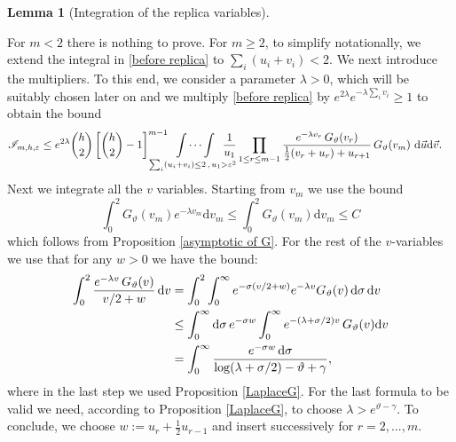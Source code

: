 \documentclass[a4paper,reqno,11pt]{amsart}
\makeatletter
\renewenvironment{proof}[1][\proofname]{\par
\pushQED{\qed}%
\normalfont \topsep4\p@\@plus4\p@\relax
\trivlist
\item[\hskip\labelsep
\bfseries
#1\@addpunct{.}]\ignorespaces
}{%
\popQED\endtrivlist\@endpefalse
}
\numberwithin{equation}{section}
\theoremstyle{mytheorem}
\newtheorem{lemma}[theorem]{Lemma}
\newcommand{\ga}{\alpha}
\newcommand{\gt}{\vartheta}
\newcommand{\gl}{\lambda}
\newcommand{\gs}{\sigma}
\renewcommand{\epsilon}{\varepsilon}
\renewcommand{\theta}{\vartheta}
\newcommand\mI{\mathscr{I}}
\newenvironment{comment}
    {\begin{center}
    \begin{tabular}{|p{0.9\textwidth}|}
    \hline\\
    \color{red}
    }
    {
    \\\\\hline
    \end{tabular}
    \end{center}
    }
\newcommand\dd{\mathrm{d}}
\makeatother
\begin{document}
{\begin{lemma}[Integration of the replica variables]
\end{lemma}
\begin{proof}
For $m<2$ there is nothing to prove. For $m\ge 2$, to simplify notationally, we extend the integral in \eqref{before replica} to $\sum_{i}(u_i+v_i)<2$.
We next introduce the multipliers. 
To this end, we consider a parameter $\gl>0$, which will be suitably chosen later on
 and we multiply \eqref{before replica} by $e^{2\gl} e^{-\gl\sum_i v_i} \geq 1$
to obtain the bound
\begin{equation}
\begin{split}
    \mI_{m,h,\epsilon}
    & \le e^{2\lambda} 
    {h \choose 2} \left[ {h\choose 2} -1 \right]^{m-1} \hskip -.5cm
    \idotsint\limits_{\sum_i(u_i+v_i)\le 2\,,\, u_1>\epsilon^2}  
    \hskip -.5cm  \frac{1}{u_1}
    \prod _{1\le r\le m-1} \frac{e^{-\gl v_r} \, G_\gt(v_r)}{\frac{1}{2}(v_r+u_r)+u_{r+1}}  \,
     G_\gt(v_m) \,\, \dd\vec u \dd\vec v .
\end{split}
\end{equation}
Next we integrate all the $v$ variables. Starting from $v_m$ we  use the bound
\begin{equation}\label{a}
        \int_0^2 G_\gt(v_m)e^{-\gl v_m} \dd v_m
        \le    \int_0^2 G_\gt(v_m) \dd v_m \le C
    \end{equation}
which follows from Proposition \ref{asymptotic of G}. For the rest of the $v$-variables we use 
that for any $w>0$ we have the bound:
    \begin{align}\label{GG-Lapl}
        \int_0^2 
        \frac{e^{-\gl v} \, G_\gt(v)}{v/2+w}  \,\dd v     
        & =  \int^2_0   \int^\infty_0e^{-\gs(v/2+w)} e^{-\gl v}G_{\gt}(v) \, \dd \gs \, \dd v \notag\\
        & \le 
        \int^\infty_0 \dd\gs \, e^{- \gs w}
        \int^\infty_0 e^{-(\gl+\gs/2) v} \,G_{\gt}(v)  \dd v  \notag \\
        & = \int^\infty_0  \frac{ e^{- \gs w} \, \dd\gs}{\log(\gl+\gs/2)-\gt+\gamma}, 
    \end{align}
where in the last step we used Proposition \ref{LaplaceG}. For the last formula to be valid we need,
according to Proposition \ref{LaplaceG}, to choose $\lambda> e^{\theta-\gamma}$.
To conclude,  we choose $w:=u_{r}+\frac{1}{2}u_{r-1}$ and insert successively for $r=2,...,m$.
\end{proof}


}
\end{document}
